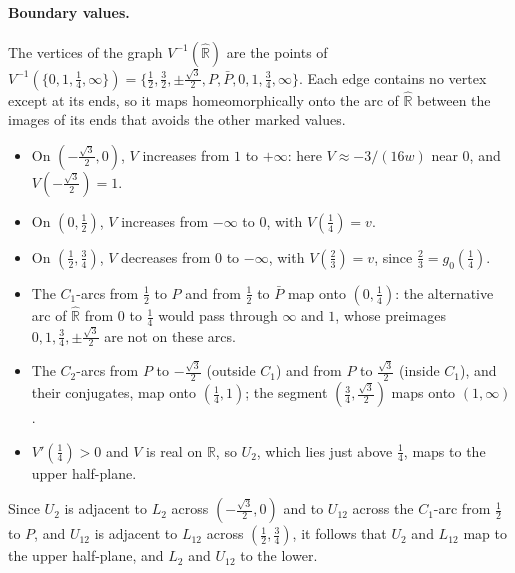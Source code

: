 \documentclass[11pt]{article}
\theoremstyle{definition}
\newcommand{\Rh}{\hat{\mathbb R}}
\begin{document}
\paragraph{Boundary values.} The vertices of the graph $V^{-1}(\Rh)$ are the points of $V^{-1}(\{0,1,\tfrac14,\infty\})=\{\tfrac12,\tfrac32,\pm\tfrac{\sqrt3}2,P,\bar P,0,1,\tfrac34,\infty\}$. Each edge contains no vertex except at its ends, so it maps homeomorphically onto the arc of $\Rh$ between the images of its ends that avoids the other marked values.
\begin{itemize}[nosep]
\item On $(-\tfrac{\sqrt3}2,0)$, $V$ increases from $1$ to $+\infty$: here $V\approx-3/(16w)$ near $0$, and $V(-\tfrac{\sqrt3}2)=1$.
\item On $(0,\tfrac12)$, $V$ increases from $-\infty$ to $0$, with $V(\tfrac14)=v$.
\item On $(\tfrac12,\tfrac34)$, $V$ decreases from $0$ to $-\infty$, with $V(\tfrac23)=v$, since $\tfrac23=g_0(\tfrac14)$.
\item The $C_1$-arcs from $\tfrac12$ to $P$ and from $\tfrac12$ to $\bar P$ map onto $(0,\tfrac14)$: the alternative arc of $\Rh$ from $0$ to $\tfrac14$ would pass through $\infty$ and $1$, whose preimages $0,1,\tfrac34,\pm\tfrac{\sqrt3}2$ are not on these arcs.
\item The $C_2$-arcs from $P$ to $-\tfrac{\sqrt3}2$ (outside $C_1$) and from $P$ to $\tfrac{\sqrt3}2$ (inside $C_1$), and their conjugates, map onto $(\tfrac14,1)$; the segment $(\tfrac34,\tfrac{\sqrt3}2)$ maps onto $(1,\infty)$.
\item $V'(\tfrac14)>0$ and $V$ is real on $\mathbb R$, so $U_2$, which lies just above $\tfrac14$, maps to the upper half-plane.
\end{itemize}
Since $U_2$ is adjacent to $L_2$ across $(-\tfrac{\sqrt3}2,0)$ and to $U_{12}$ across the $C_1$-arc from $\tfrac12$ to $P$, and $U_{12}$ is adjacent to $L_{12}$ across $(\tfrac12,\tfrac34)$, it follows that $U_2$ and $L_{12}$ map to the upper half-plane, and $L_2$ and $U_{12}$ to the lower.
\end{document}
